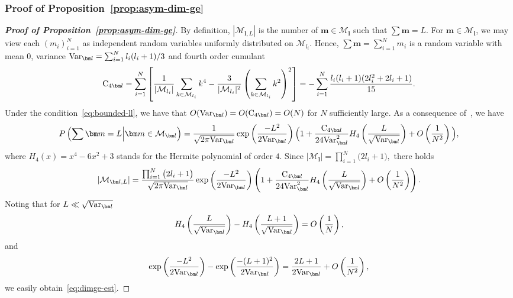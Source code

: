 \documentclass{article}
\newcommand{\card}[1]{|{#1}|}
\numberwithin{equation}{section}
\def\bl{{\bm l}}
\def\bbm{{\bm m}}
\def\calM{\mathcal{M}}
\def\Nat{{N}}
\begin{document}
\subsubsection{Proof of Proposition~\ref{prop:asym-dim-ge}}\label{sec:proof-asym-dim-ge}

\begin{proof}[\bf{Proof of Proposition~\ref{prop:asym-dim-ge}}]
By definition, $\card{\calM_{\bl,L}}$ is the number of $\bbm\in\calM_\bl$ such that $\sum\bbm=L$.
For $\bbm\in\calM_\bl$, we may view each $(m_i)_{i=1}^N$ as independent random variables uniformly distributed on $\calM_{l_i}$. Hence, $\sum\bbm = \sum_{i=1}^N m_i$ is a random variable with mean 0,  variance $\textup{Var}_{\bl} = \sum_{i=1}^N l_i(l_i+1)/3$ and fourth order cumulant 
\[
\textup{C}_{4\bl} = \sum_{i=1}^\Nat \left[ \frac{1}{|\calM_{l_i}|}\sum_{k\in\calM_{l_i}} k^4 - \frac{3}{|\calM_{l_i}|^2} \left( \sum_{k\in\calM_{l_i}} k^2 \right)^2 \right] = -\sum_{i=1}^N \frac{l_i (l_i+1) (2l_i^2 + 2l_i+1)}{15}.
\]
Under the condition~\eqref{eq:bounded-ll}, we have that $O(\textup{Var}_{\bl})=O(\textup{C}_{4\bl})=O(N)$ for $N$ sufficiently large. 
As a consequence of~\cite[Ch.~VII, Theorem~12]{petrov1975-si}, we have
\begin{equation*}
    P
    \left(\sum\bbm=L{\Big|}\bbm\in\calM_{\bl}
    \right) = 
    \frac{1}{\sqrt{2\pi \textup{Var}_{\bl}}}
    \exp\left(\frac{-L^2}{2\textup{Var}_{\bl}}\right)
        \Big(1 + \frac{\textup{C}_{4\bl}}{24 \textup{Var}_{\bl}^{2}}H_4
        \left(\frac{L}{\sqrt{\textup{Var}_{\bl}}}\right) + O\left(\frac{1}{\Nat^{2}}\right)\Big),
\end{equation*}
where $H_4(x) = x^4-6x^2+3$ stands for the Hermite polynomial of order $4$.
Since
$    |\calM_\bl|=\prod_{i=1}^N\big(2l_i+1\big), $
there holds
\begin{equation*}
    \card{\calM_{\bl,L}} = 
    \frac{\prod_{i=1}^N\big(2l_i+1\big)}{\sqrt{2\pi \textup{Var}_{\bl}}}
    \exp\left(\frac{-L^2}{2\textup{Var}_{\bl}}\right)
        \left(1 + \frac{\textup{C}_{4\bl}}{24 \textup{Var}_{\bl}^{2}}H_4\left(\frac{L}{\sqrt{\textup{Var}_{\bl}}}\right) + O\left(\frac{1}{\Nat^{2}}\right)\right).
\end{equation*}
Noting that for $L\ll \sqrt{\textup{Var}_{\bl}}$
\[
    H_4 \left(\frac{L}{\sqrt{\textup{Var}_{\bl}}} \right) - H_4 \left(\frac{L+1}{\sqrt{\textup{Var}_{\bl}}}\right) = O\left(\frac{1}{N}\right),
\]
and 
\[
    \exp\left(\frac{-L^2}{2\textup{Var}_{\bl}}\right) -  \exp\left(\frac{-(L+1)^2}{2\textup{Var}_{\bl}}\right)
    = 
    \frac{2L+1}{2\textup{Var}_{\bl}} + O\left(\frac{1}{N^2}\right), 
\]
we easily obtain~\eqref{eq:dimge-est}. 
\end{proof}
\end{document}
